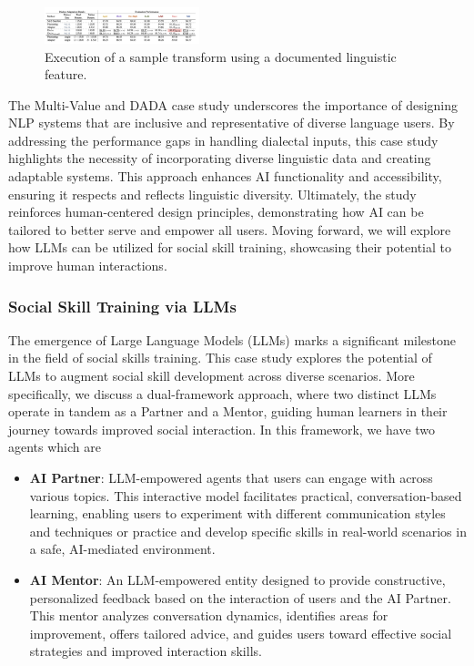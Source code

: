 \documentclass[
  letterpaper,
  DIV=11,
  numbers=noendperiod,
  oneside]{scrreprt}
\theoremstyle{remark}
\begin{document}
\begin{figure}

{\centering \includegraphics[width=0.4\textwidth,height=\textheight]{src/Figures/MV4.png}

}

\caption{Execution of a sample transform using a documented linguistic
feature.}

\end{figure}%

The Multi-Value and DADA case study underscores the importance of
designing NLP systems that are inclusive and representative of diverse
language users. By addressing the performance gaps in handling dialectal
inputs, this case study highlights the necessity of incorporating
diverse linguistic data and creating adaptable systems. This approach
enhances AI functionality and accessibility, ensuring it respects and
reflects linguistic diversity. Ultimately, the study reinforces
human-centered design principles, demonstrating how AI can be tailored
to better serve and empower all users. Moving forward, we will explore
how LLMs can be utilized for social skill training, showcasing their
potential to improve human interactions.

\subsubsection{Social Skill Training via
LLMs}\label{social-skill-training-via-llms}

The emergence of Large Language Models (LLMs) marks a significant
milestone in the field of social skills training. This case study
explores the potential of LLMs to augment social skill development
across diverse scenarios. More specifically, we discuss a dual-framework
approach, where two distinct LLMs operate in tandem as a Partner and a
Mentor, guiding human learners in their journey towards improved social
interaction. In this framework, we have two agents which are

\begin{itemize}
\item
  \textbf{AI Partner}: LLM-empowered agents that users can engage with
  across various topics. This interactive model facilitates practical,
  conversation-based learning, enabling users to experiment with
  different communication styles and techniques or practice and develop
  specific skills in real-world scenarios in a safe, AI-mediated
  environment.
\item
  \textbf{AI Mentor}: An LLM-empowered entity designed to provide
  constructive, personalized feedback based on the interaction of users
  and the AI Partner. This mentor analyzes conversation dynamics,
  identifies areas for improvement, offers tailored advice, and guides
  users toward effective social strategies and improved interaction
  skills.
\end{itemize}
\end{document}
